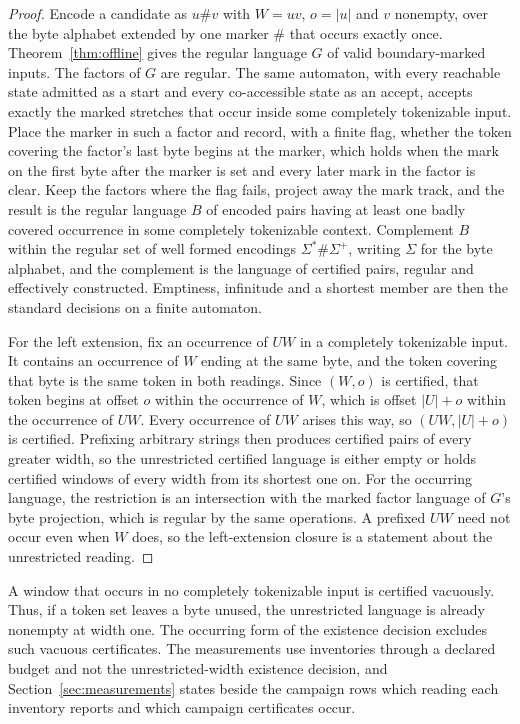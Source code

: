 \documentclass[11pt,a4paper]{article}
\theoremstyle{definition}
\theoremstyle{plain}
\begin{document}
\begin{proof}
Encode a candidate as $u \# v$ with $W = uv$, $o = |u|$ and $v$ nonempty, over the byte alphabet extended by one marker
$\#$ that occurs exactly once. Theorem~\ref{thm:offline} gives the regular language $G$ of valid boundary-marked inputs.
The factors of $G$ are regular. The same automaton, with every reachable state admitted as a start and every
co-accessible state as an accept, accepts exactly the marked stretches that occur inside some completely tokenizable
input. Place the marker in such a factor and record, with a finite flag, whether the token covering the factor's last
byte begins at the marker, which holds when the mark on the first byte after the marker is set and every later mark in
the factor is clear. Keep the factors where the flag fails, project away the mark track, and the result is the regular
language $B$ of encoded pairs having at least one badly covered occurrence in some completely tokenizable context.
Complement $B$ within the regular set of well formed encodings $\Sigma^{*}\#\Sigma^{+}$, writing $\Sigma$ for the byte
alphabet, and the complement is the language of certified pairs, regular and effectively constructed. Emptiness,
infinitude and a shortest member are then the standard decisions on a finite automaton.

For the left extension, fix an occurrence of $UW$ in a completely tokenizable input. It contains an occurrence of $W$
ending at the same byte, and the token covering that byte is the same token in both readings. Since $(W, o)$ is
certified, that token begins at offset $o$ within the occurrence of $W$, which is offset $|U| + o$ within the occurrence
of $UW$. Every occurrence of $UW$ arises this way, so $(UW, |U| + o)$ is certified. Prefixing arbitrary strings then
produces certified pairs of every greater width, so the unrestricted certified language is either empty or holds
certified windows of every width from its shortest one on. For the occurring language, the restriction is an
intersection with the marked factor language of $G$'s byte projection, which is regular by the same operations. A
prefixed $UW$ need not occur even when $W$ does, so the left-extension closure is a statement about the unrestricted
reading.
\end{proof}

A window that occurs in no completely tokenizable input is certified vacuously. Thus, if a token set leaves a byte
unused, the unrestricted language is already nonempty at width one. The occurring form of the existence decision
excludes such vacuous certificates. The measurements use inventories through a declared budget and not the
unrestricted-width existence decision, and Section~\ref{sec:measurements} states beside the campaign rows which reading
each inventory reports and which campaign certificates occur.
\end{document}
